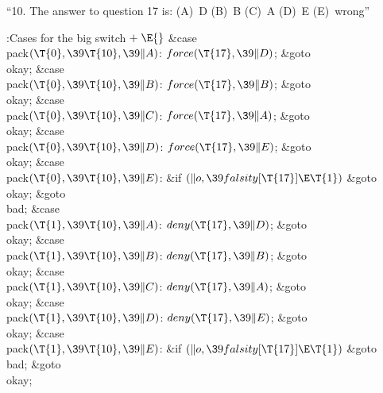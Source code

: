 ``10. The answer to question 17 is:
(A)~D (B)~B (C)~A (D)~E (E)~wrong''

\Y\B\4:Cases for the big switch\X${}\mathrel+\E{}$\6
\4\&{case} \\{pack}${}(\T{0},\39\T{10},\39\|A){}$:\5
${}\\{force}(\T{17},\39\|D){}$;\5
\&{goto} \\{okay};\6
\4\&{case} \\{pack}${}(\T{0},\39\T{10},\39\|B){}$:\5
${}\\{force}(\T{17},\39\|B){}$;\5
\&{goto} \\{okay};\6
\4\&{case} \\{pack}${}(\T{0},\39\T{10},\39\|C){}$:\5
${}\\{force}(\T{17},\39\|A){}$;\5
\&{goto} \\{okay};\6
\4\&{case} \\{pack}${}(\T{0},\39\T{10},\39\|D){}$:\5
${}\\{force}(\T{17},\39\|E){}$;\5
\&{goto} \\{okay};\6
\4\&{case} \\{pack}${}(\T{0},\39\T{10},\39\|E){}$:\5
\&{if} ${}(\|o,\39\\{falsity}[\T{17}]\E\T{1}){}$\1\5
\&{goto} \\{okay};\5
\2\&{goto} \\{bad};\6
\4\&{case} \\{pack}${}(\T{1},\39\T{10},\39\|A){}$:\5
${}\\{deny}(\T{17},\39\|D){}$;\5
\&{goto} \\{okay};\6
\4\&{case} \\{pack}${}(\T{1},\39\T{10},\39\|B){}$:\5
${}\\{deny}(\T{17},\39\|B){}$;\5
\&{goto} \\{okay};\6
\4\&{case} \\{pack}${}(\T{1},\39\T{10},\39\|C){}$:\5
${}\\{deny}(\T{17},\39\|A){}$;\5
\&{goto} \\{okay};\6
\4\&{case} \\{pack}${}(\T{1},\39\T{10},\39\|D){}$:\5
${}\\{deny}(\T{17},\39\|E){}$;\5
\&{goto} \\{okay};\6
\4\&{case} \\{pack}${}(\T{1},\39\T{10},\39\|E){}$:\5
\&{if} ${}(\|o,\39\\{falsity}[\T{17}]\E\T{1}){}$\1\5
\&{goto} \\{bad};\5
\2\&{goto} \\{okay};\par
\fi


